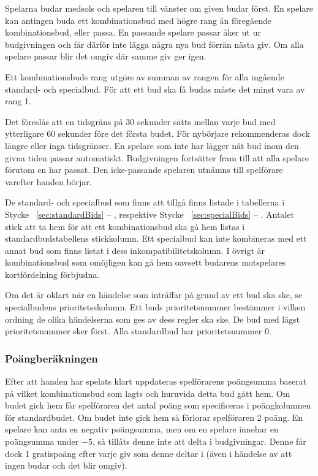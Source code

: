 \documentclass[a4paper]{article}
\renewcommand{\sectionref}[1]{%
	\ref{sec:#1} -- \nameref{sec:#1}%
}
\begin{document}
	Spelarna budar medsols och spelaren till vänster om given budar först. En spelare kan antingen buda ett kombinationsbud med högre rang än föregående kombinationsbud, eller passa. En passande spelare passar åker ut ur budgivningen och får därför inte lägga några nya bud förrän nästa giv. Om alla spelare passar blir det omgiv där samme giv ger igen.

	Ett kombinationsbuds rang utgörs av summan av rangen för alla ingående standard- och specialbud. För att ett bud ska få budas måste det minst vara av rang 1.

	Det föreslås att en tidsgräns på 30 sekunder sätts mellan varje bud med ytterligare 60 sekunder före det första budet. För nybörjare rekommenderas dock längre eller inga tidsgränser. En spelare som inte har lägger nåt bud inom den givna tiden passar automatiskt. Budgivningen fortsätter fram till att alla spelare förutom en har passat. Den icke-passande spelaren utnämns till spelförare varefter handen börjar.

	De standard- och specialbud som finns att tillgå finns listade i tabellerna i Stycke~\sectionref{standardBids}, respektive Stycke~\sectionref{specialBids}. Antalet stick att ta hem för att ett kombinationsbud ska gå hem listas i standardbudstabellens stickkolumn. Ett specialbud kan inte kombineras med ett annat bud som finns listat i dess inkompatibilitetskolumn. I övrigt är kombinationsbud som omöjligen kan gå hem oavsett budarens motspelares kortfördelning förbjudna.

	Om det är oklart när en händelse som inträffar på grund av ett bud ska ske, se specialbudens prioritetsskolumn. Ett buds prioritetsnummer bestämmer i vilken ordning de olika händelserna som ges av dess regler ska ske. De bud med lägst prioritetsnummer sker först. Alla standardbud har prioritetsnummer 0.

	\subsubsection{Poängberäkningen}
	Efter att handen har spelats klart uppdateras spelförarens poängsumma baserat på vilket kombinationsbud som lagts och huruvida detta bud gått hem. Om budet gick hem får spelföraren det antal poäng som specificeras i poängkolumnen för standardbudet. Om budet inte gick hem så förlorar spelföraren 2 poäng. En spelare kan anta en negativ poängsumma, men om en spelare innehar en poängsumma under $-5$, så tillåts denne inte att delta i budgivningar. Denne får dock 1 gratispoäng efter varje giv som denne deltar i (även i händelse av att ingen budar och det blir omgiv).
\end{document}
